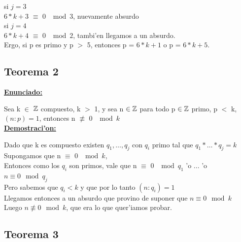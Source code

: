si $j = 3$\\

$6*k + 3$ $\equiv$ 0  $\mod{3}$, nuevamente absurdo\\

si $j = 4$\\

$6*k + 4$ $\equiv$ 0  $\mod{2}$, tambi'en llegamos a un absurdo.\\

Ergo, si p es primo y p $>$ 5, entonces p = $6*k+1$ o p = $6*k +5$.

\subsection{Teorema 2}
\label{demo2}

\textbf{\underline{Enunciado:}\\}

Sea k $\in$ ${\mathbb Z}$ compuesto, k $>$ 1, y sea n ${\in {\mathbb Z}}$ para todo p ${\in {\mathbb Z}}$ primo, p $<$ k, $(n:p) = 1$, entonces n $\not\equiv$ 0 $\mod{k}$\\

\textbf{\underline{Demostraci'on:}\\}

Dado que k es compuesto existen $q_1,\ldots,q_j$ con $q_i$ primo tal que $q_1*\ldots*q_j = k$ \\

Supongamos que n $\equiv$ 0 $\mod{k}$,\\

Entonces como los $q_i$ son primos, vale que n $\equiv$ 0 $\mod{q_1}$ 'o ... 'o $n \equiv 0 \mod{q_j}$ \\

Pero sabemos que $q_i < k$ y que por lo tanto $(n:q_{i}) = 1$ \\

Llegamos entonces a un absurdo que provino de suponer que  $n \equiv 0 \mod{k}$ \\ 

Luego $n \not\equiv 0 \mod{k}$, que era lo que quer'iamos probar.


\subsection{Teorema 3}
\label{demo3}

